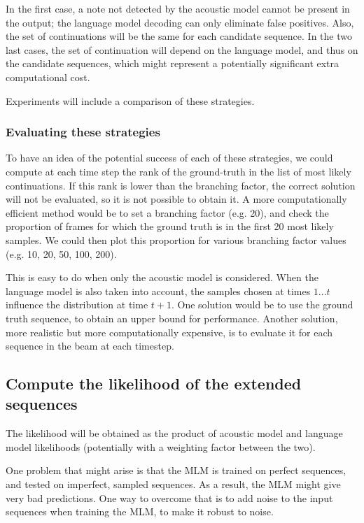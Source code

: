 \documentclass{article}
\begin{document}
In the first case, a note not detected by the acoustic model cannot be present in the output; the language model decoding can only eliminate false positives.
Also, the set of continuations will be the same for each candidate sequence.
In the two last cases, the set of continuation will depend on the language model, and thus on the candidate sequences, which might represent a potentially significant extra computational cost.

Experiments will include a comparison of these strategies.

\subsubsection{Evaluating these strategies}

To have an idea of the potential success of each of these strategies, we could compute at each time step the rank of the ground-truth in the list of most likely continuations.
If this rank is lower than the branching factor, the correct solution will not be evaluated, so it is not possible to obtain it.
A more computationally efficient method would be to set a branching factor (e.g. 20), and check the proportion of frames for which the ground truth is in the first 20 most likely samples.
We could then plot this proportion for various branching factor values (e.g. 10, 20, 50, 100, 200).

This is easy to do when only the acoustic model is considered.
When the language model is also taken into account, the samples chosen at times $1 ... t$ influence the distribution at time $t+1$.
One solution would be to use the ground truth sequence, to obtain an upper bound for performance.
Another solution, more realistic but more computationally expensive, is to evaluate it for each sequence in the beam at each timestep.



\subsection{Compute the likelihood of the extended sequences}
\label{sec:schedsamp}

The likelihood will be obtained as the product of acoustic model and language model likelihoods (potentially with a weighting factor between the two).

One problem that might arise is that the MLM is trained on perfect sequences, and tested on imperfect, sampled sequences.
As a result, the MLM might give very bad predictions.
One way to overcome that is to add noise to the input sequences when training the MLM, to make it robust to noise.
\end{document}
